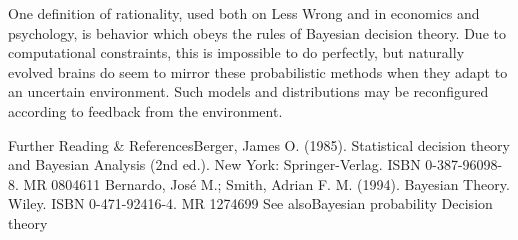 One definition of rationality, used both on Less Wrong and in economics and psychology, is behavior which obeys the rules of Bayesian decision theory. Due to computational constraints, this is impossible to do perfectly, but naturally evolved brains do seem to mirror these probabilistic methods when they adapt to an uncertain environment. Such models and distributions may be reconfigured according to feedback from the environment. 

Further Reading & ReferencesBerger, James O. (1985). Statistical decision theory and Bayesian Analysis (2nd ed.). New York: Springer-Verlag. ISBN 0-387-96098-8. MR 0804611 
Bernardo, José M.; Smith, Adrian F. M. (1994). Bayesian Theory. Wiley. ISBN 0-471-92416-4. MR 1274699 
See alsoBayesian probability 
Decision theory 
